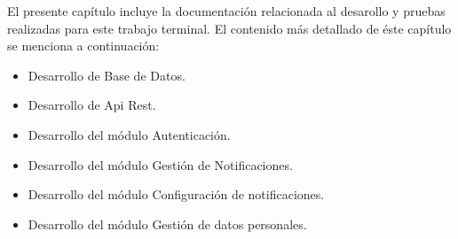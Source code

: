 El presente capítulo incluye la documentación relacionada al desarollo y pruebas realizadas para este trabajo terminal. El contenido más detallado de éste capítulo se menciona a continuación:

\begin{itemize}
	\item Desarrollo de Base de Datos.
	\item Desarrollo de Api Rest.
	\item Desarrollo del módulo Autenticación.
	\item Desarrollo del módulo Gestión de Notificaciones.
	\item Desarrollo del módulo Configuración de notificaciones.
	\item Desarrollo del módulo Gestión de datos personales.
\end{itemize}

\newpage
{}